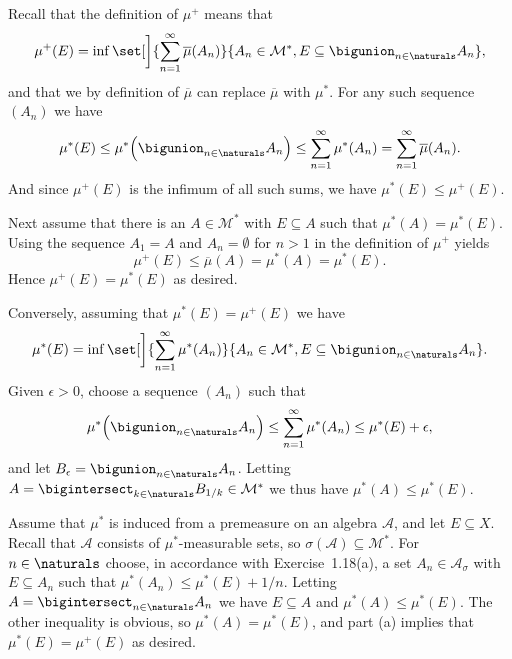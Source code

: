 \documentclass[article, a4paper, 11pt, oneside]{memoir}
\numberwithin{equation}{chapter}
\newcommand{\calM}{\mathcal{M}}
\newcommand{\calA}{\mathcal{A}}
\begin{document}
\begin{solution}
    \item Recall that the definition of $\mu^+$ means that
    \begin{equation*}
        \mu^+(E)
            = \inf \set[\bigg]{ \sum_{n=1}^\infty \overline\mu(A_n) }{ A_n \in \calM^*, E \subseteq \bigunion_{n\in\naturals} A_n },
    \end{equation*}
    and that we by definition of $\overline\mu$ can replace $\overline\mu$ with $\mu^*$. For any such sequence $(A_n)$ we have
    \begin{equation*}
        \mu^*(E)
            \leq \mu^* \Bigl( \bigunion_{n\in\naturals} A_n \Bigr)
            \leq \sum_{n=1}^\infty \mu^*(A_n)
            = \sum_{n=1}^\infty \overline\mu(A_n).
    \end{equation*}
    And since $\mu^+(E)$ is the infimum of all such sums, we have $\mu^*(E) \leq \mu^+(E)$.

    Next assume that there is an $A \in \calM^*$ with $E \subseteq A$ such that $\mu^*(A) = \mu^*(E)$. Using the sequence $A_1 = A$ and $A_n = \emptyset$ for $n > 1$ in the definition of $\mu^+$ yields
    \begin{equation*}
        \mu^+(E)
            \leq \overline\mu(A)
            = \mu^*(A)
            = \mu^*(E).
    \end{equation*}
    Hence $\mu^+(E) = \mu^*(E)$ as desired.

    Conversely, assuming that $\mu^*(E) = \mu^+(E)$ we have
    \begin{equation*}
        \mu^*(E)
            = \inf \set[\bigg]{ \sum_{n=1}^\infty \mu^*(A_n) }{ A_n \in \calM^*, E \subseteq \bigunion_{n\in\naturals} A_n }.
    \end{equation*}
    Given $\epsilon > 0$, choose a sequence $(A_n)$ such that
    \begin{equation*}
        \mu^* \Bigl( \bigunion_{n\in\naturals} A_n \Bigr)
            \leq \sum_{n=1}^\infty \mu^*(A_n)
            \leq \mu^*(E) + \epsilon,
    \end{equation*}
    and let $B_\epsilon = \bigunion_{n\in\naturals} A_n$. Letting $A = \bigintersect_{k\in\naturals} B_{1/k} \in \calM^*$ we thus have $\mu^*(A) \leq \mu^*(E)$.

    \item Assume that $\mu^*$ is induced from a premeasure on an algebra $\calA$, and let $E \subseteq X$. Recall that $\calA$ consists of $\mu^*$-measurable sets, so $\sigma(\calA) \subseteq \calM^*$. For $n \in \naturals$ choose, in accordance with Exercise~1.18(a), a set $A_n \in \calA_\sigma$ with $E \subseteq A_n$ such that $\mu^*(A_n) \leq \mu^*(E) + 1/n$. Letting $A = \bigintersect_{n\in\naturals} A_n$ we have $E \subseteq A$ and $\mu^*(A) \leq \mu^*(E)$. The other inequality is obvious, so $\mu^*(A) = \mu^*(E)$, and part (a) implies that $\mu^*(E) = \mu^+(E)$ as desired.
\end{solution}
\end{document}
